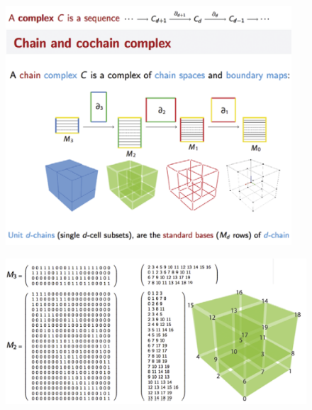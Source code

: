 \documentclass[10pt]{beamer}
\begin{document}
\begin{frame}
\begin{figure}
    \centering
    \includegraphics[width=0.95\textwidth]{figs/L02-chain-complex.png}
\end{figure}
    
\end{frame}


\begin{frame}
\begin{figure}
    \centering
    \includegraphics[width=\textwidth]{figs/L02-characteristic-matrices.png}
\end{figure}
\end{frame}
\end{document}
